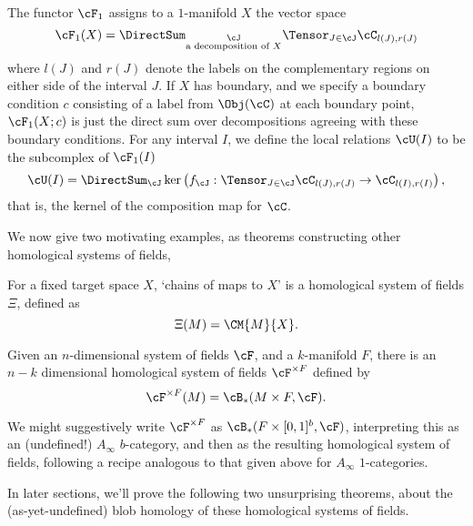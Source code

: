 The functor $\cF_1$ assigns to a $1$-manifold $X$ the vector space
\begin{equation*}
\cF_1(X) = \DirectSum_{\substack{\cJ \\ \text{a decomposition of $X$}}} \Tensor_{J \in \cJ} \cC_{l(J),r(J)}
\end{equation*}
where $l(J)$ and $r(J)$ denote the labels on the complementary regions on either side of the interval $J$. If $X$ has boundary, and we specify a boundary condition $c$ consisting of a label from $\Obj(\cC)$ at each boundary point, $\cF_1(X;c)$ is just the direct sum over decompositions agreeing with these boundary conditions. For any interval $I$, we define the local relations $\cU(I)$ to be the subcomplex of $\cF_1(I)$
\begin{equation*}
\cU(I) = \DirectSum_{\cJ} \ker\left(f_\cJ : \Tensor_{J \in \cJ} \cC_{l(J),r(J)} \to \cC_{l(I),r(I)} \right),
\end{equation*}
that is, the kernel of the composition map for $\cC$.


We now give two motivating examples, as theorems constructing other homological systems of fields,


\begin{thm}
For a fixed target space $X$, `chains of maps to $X$' is a homological system of fields $\Xi$, defined as
\begin{equation*}
\Xi(M) = \CM{M}{X}.
\end{equation*}
\end{thm}

\begin{thm}
Given an $n$-dimensional system of fields $\cF$, and a $k$-manifold $F$, there is an $n-k$ dimensional homological system of fields $\cF^{\times F}$ defined by
\begin{equation*}
\cF^{\times F}(M) = \cB_*(M \times F, \cF).
\end{equation*}
\end{thm}
We might suggestively write $\cF^{\times F}$ as  $\cB_*(F \times [0,1]^b, \cF)$, interpreting this as an (undefined!) $A_\infty$ $b$-category, and then as the resulting homological system of fields, following a recipe analogous to that given above for $A_\infty$ $1$-categories.


In later sections, we'll prove the following two unsurprising theorems, about the (as-yet-undefined) blob homology of these homological systems of fields.



